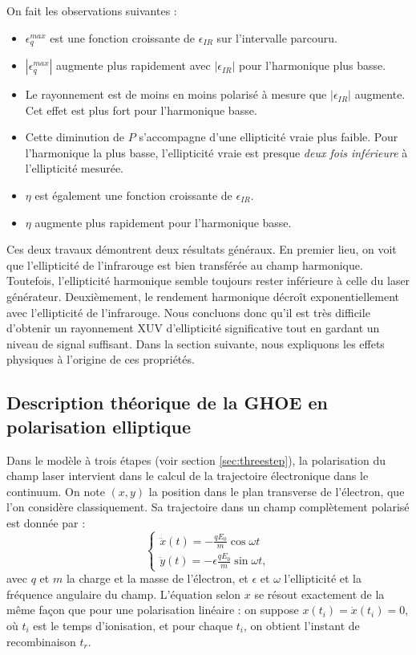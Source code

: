 On fait les observations suivantes :
\begin{itemize}
\renewcommand{\labelitemi}{$\bullet$}
\setlength\itemsep{1em}
\item $\epsilon^{max}_q$ est une fonction croissante de $\epsilon_{IR}$ sur l'intervalle parcouru.
\item $|\epsilon^{max}_q|$ augmente plus rapidement avec $|\epsilon_{IR}|$ pour l'harmonique plus basse.
\item Le rayonnement est de moins en moins polarisé à mesure que $|\epsilon_{IR}|$ augmente. Cet effet est plus fort pour l'harmonique basse.
\item Cette diminution de $P$ s'accompagne d'une ellipticité vraie plus faible. Pour l'harmonique la plus basse, l'ellipticité vraie est presque \textit{deux fois inférieure} à l'ellipticité mesurée.
\item $\eta$ est également une fonction croissante de $\epsilon_{IR}$.
\item $\eta$ augmente plus rapidement pour l'harmonique basse.
\end{itemize}
\vspace{\baselineskip}
Ces deux travaux démontrent deux résultats généraux. En premier lieu, on voit que l'ellipticité de l'infrarouge est bien transférée au champ harmonique. Toutefois, l'ellipticité harmonique semble toujours rester inférieure à celle du laser générateur. Deuxièmement, le rendement harmonique décroît exponentiellement avec l'ellipticité de l'infrarouge. Nous concluons donc qu'il est très difficile d'obtenir un rayonnement XUV d'ellipticité significative tout en gardant un niveau de signal suffisant. Dans la section suivante, nous expliquons les effets physiques à l'origine de ces propriétés.

\subsection{Description théorique de la GHOE en polarisation elliptique}
Dans le modèle à trois étapes (voir section \ref{sec:threestep}), la polarisation du champ laser intervient dans le calcul de la trajectoire électronique dans le continuum. On note $(x,y)$ la position dans le plan transverse de l'électron, que l'on considère classiquement. Sa trajectoire dans un champ complètement polarisé est donnée par :
\[\left\{
\begin{array}{l}
  \ddot{x}(t) = -\frac{qE_0}{m}\cos\omega t \\
  \ddot{y}(t) = -\epsilon\frac{qE_0}{m}\sin\omega t,
\end{array}
\right.\]
avec $q$ et $m$ la charge et la masse de l'électron, et $\epsilon$ et $\omega$ l'ellipticité et la fréquence angulaire du champ. L'équation selon $x$ se résout exactement de la même façon que pour une polarisation linéaire : on suppose $x(t_i) = \dot{x}(t_i) = 0$, où $t_i$ est le temps d'ionisation, et pour chaque $t_i$, on obtient l'instant de recombinaison $t_r$.

